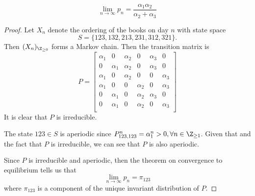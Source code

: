 \documentclass[
  coursecode={MTHE 455},
  assignmentname={Assignment \assignmentnumber},
  studentnumber=20053722,
  name={Bryan Hoang},
  draft,
]{
  ltxanswer%
}
\begin{document}
  \begin{questions}
    \setcounter{question}{\questionnumber}
    \addtocounter{question}{-1}
    \question[5]{}
    \begin{solution}
      \begin{claim}
        \begin{equation*}
          \lim_{n \to \infty} p_{n} = \frac{\alpha_{1}\alpha_{2}}{\alpha_{2}+\alpha_{3}}
        \end{equation*}
      \end{claim}
      \begin{proof}
        Let \(X_{n}\) denote the ordering of the books on day \(n\) with state space
        \begin{equation*}
          S=\{123, 132, 213, 231, 312, 321\}.
        \end{equation*}
        Then \((X_{n})_{\Z_{\ge 0}}\) forms a Markov chain. Then the transition matrix is
        \begin{equation*}
          P = \begin{bmatrix}
            \alpha_{1} & 0          & \alpha_{2} & 0          & \alpha_{3} & 0          \\
            0          & \alpha_{1} & \alpha_{2} & 0          & \alpha_{3} & 0          \\
            \alpha_{1} & 0          & \alpha_{2} & 0          & 0          & \alpha_{3} \\
            \alpha_{1} & 0          & 0          & \alpha_{2} & 0          & \alpha_{3} \\
            0          & \alpha_{1} & 0          & \alpha_{2} & \alpha_{3} & 0          \\
            0          & \alpha_{1} & 0          & \alpha_{2} & 0          & \alpha_{3} \\
          \end{bmatrix}
        \end{equation*}
        It is clear that \(P\) is irreducible.

        The state \(123 \in S\) is aperiodic since \(P_{123,123}^{n} = \alpha_{1}^{n} > 0, \forall n \in \Z_{\ge 1}\). Given that and the fact that \(P\) is irreducible, we can see that \(P\) is also aperiodic.

        Since \(P\) is irreducible and aperiodic, then the theorem on convergence to equilibrium tells us that
        \begin{equation*}
          \lim_{n \to \infty} p_{n} = \pi_{123}
        \end{equation*}
        where \(\pi_{123}\) is a component of the unique invariant distribution of \(P\).


\end{proof}
\end{solution}
\end{questions}
\end{document}
